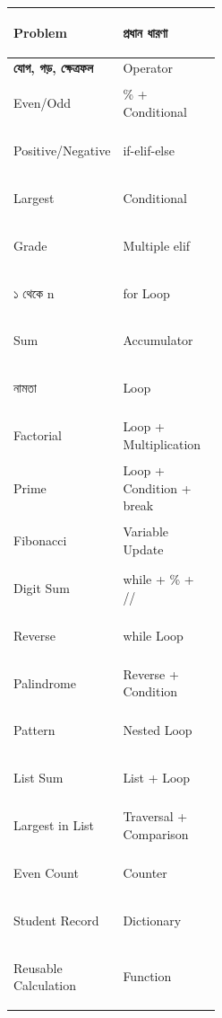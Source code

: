 

\begin{tabularx}
{\linewidth}
{
|>{\bfseries\RaggedRight\arraybackslash}p{0.46\linewidth}
|Y|
}

\hline
{}

\textbf{Problem}
&
\textbf{প্রধান ধারণা}
\\
\hline

যোগ, গড়, ক্ষেত্রফল
&
Operator
\\
\hline

Even/Odd
&
\textenglish{\ttfamily \%} + Conditional
\\
\hline

Positive/Negative
&
\textenglish{\ttfamily if-elif-else}
\\
\hline

Largest
&
Conditional
\\
\hline

Grade
&
Multiple
\textenglish{\ttfamily elif}
\\
\hline

১ থেকে n
&
\textenglish{\ttfamily for}
Loop
\\
\hline

Sum
&
Accumulator
\\
\hline

নামতা
&
Loop
\\
\hline

Factorial
&
Loop + Multiplication
\\
\hline

Prime
&
Loop + Condition +
\textenglish{\ttfamily break}
\\
\hline

Fibonacci
&
Variable Update
\\
\hline

Digit Sum
&
\textenglish{\ttfamily while + \% + //}
\\
\hline

Reverse
&
\textenglish{\ttfamily while}
Loop
\\
\hline

Palindrome
&
Reverse + Condition
\\
\hline

Pattern
&
Nested Loop
\\
\hline

List Sum
&
List + Loop
\\
\hline

Largest in List
&
Traversal + Comparison
\\
\hline

Even Count
&
Counter
\\
\hline

Student Record
&
Dictionary
\\
\hline

Reusable Calculation
&
Function
\\
\hline

\end{tabularx}

